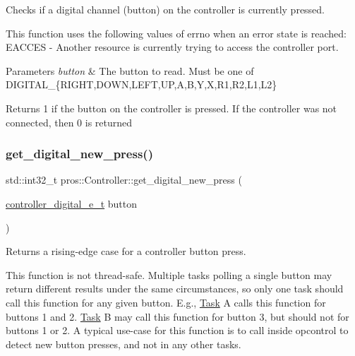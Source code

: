 Checks if a digital channel (button) on the controller is currently pressed. 

This function uses the following values of errno when an error state is reached\+: E\+A\+C\+C\+ES -\/ Another resource is currently trying to access the controller port.


\begin{DoxyParams}{Parameters}
{\em button} & The button to read. Must be one of D\+I\+G\+I\+T\+A\+L\+\_\+\{R\+I\+G\+HT,D\+O\+WN,L\+E\+FT,UP,A,B,Y,X,R1,R2,L1,L2\}\\
\hline
\end{DoxyParams}
\begin{DoxyReturn}{Returns}
1 if the button on the controller is pressed. If the controller was not connected, then 0 is returned 
\end{DoxyReturn}
\mbox{\label{classpros_1_1Controller_a9dc7dc6028431d3f8f9aff0fc7a4bed6}} 
\subsubsection{\texorpdfstring{get\+\_\+digital\+\_\+new\+\_\+press()}{get\_digital\_new\_press()}}
{\footnotesize\ttfamily std\+::int32\+\_\+t pros\+::\+Controller\+::get\+\_\+digital\+\_\+new\+\_\+press (\begin{DoxyParamCaption}\item[{\hyperlink{misc_8h_a8c380ff02828ee53954bc0ce274253ed}{controller\+\_\+digital\+\_\+e\+\_\+t}}]{button }\end{DoxyParamCaption})}



Returns a rising-\/edge case for a controller button press. 

This function is not thread-\/safe. Multiple tasks polling a single button may return different results under the same circumstances, so only one task should call this function for any given button. E.\+g., \hyperlink{classpros_1_1Task}{Task} A calls this function for buttons 1 and 2. \hyperlink{classpros_1_1Task}{Task} B may call this function for button 3, but should not for buttons 1 or 2. A typical use-\/case for this function is to call inside opcontrol to detect new button presses, and not in any other tasks.

